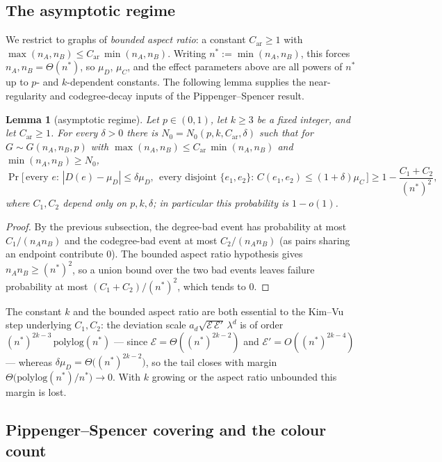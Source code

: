 \documentclass[11pt,a4paper]{article}
\newtheorem{lemma}[theorem]{Lemma}
\theoremstyle{definition}
\theoremstyle{remark}
\begin{document}
\subsection{The asymptotic regime}

We restrict to graphs of \emph{bounded aspect ratio}: a constant
$C_{\mathrm{ar}} \geq 1$ with
$\max(n_A, n_B) \leq C_{\mathrm{ar}}\,\min(n_A, n_B)$. Writing
$n^* := \min(n_A, n_B)$, this forces $n_A, n_B = \Theta(n^*)$, so
$\mu_D$, $\mu_C$, and the effect parameters above are all powers of
$n^*$ up to $p$- and $k$-dependent constants. The following lemma supplies the
near-regularity and codegree-decay inputs of the Pippenger--Spencer result.

\begin{lemma}[asymptotic regime]
\label{lem:asymp-regime}
Let $p \in (0, 1)$, let $k \geq 3$ be a fixed integer, and let
$C_{\mathrm{ar}} \geq 1$. For every $\delta > 0$ there is
$N_0 = N_0(p, k, C_{\mathrm{ar}}, \delta)$ such that for
$G \sim G(n_A, n_B, p)$ with
$\max(n_A, n_B) \leq C_{\mathrm{ar}}\,\min(n_A, n_B)$ and
$\min(n_A, n_B) \geq N_0$,
\[
\Pr\bigl[\,
\text{every } e\!:\, |D(e) - \mu_D| \leq \delta \mu_D,\ \
\text{every disjoint } \{e_1, e_2\}\!:\, C(e_1, e_2) \leq (1 + \delta)\mu_C
\,\bigr] \geq 1 - \frac{C_1 + C_2}{(n^*)^2},
\]
where $C_1, C_2$ depend only on $p, k, \delta$; in particular this
probability is $1 - o(1)$.
\end{lemma}

\begin{proof}
By the previous subsection, the degree-bad event has probability at
most $C_1 / (n_A n_B)$ and the codegree-bad event at most
$C_2 / (n_A n_B)$ (as pairs sharing an endpoint contribute $0$). The
bounded aspect ratio hypothesis gives $n_A n_B \geq (n^*)^2$, so a
union bound over the two bad events leaves failure probability at most
$(C_1 + C_2) / (n^*)^2$, which tends to $0$.
\end{proof}

The constant $k$ and the bounded aspect ratio are both essential to
the Kim--Vu step underlying $C_1, C_2$: the deviation scale
$a_d \sqrt{\mathcal{E}\,\mathcal{E}'}\,\lambda^d$ is of order
$(n^*)^{2k-3}\,\mathrm{polylog}(n^*)$ --- since
$\mathcal{E} = \Theta((n^*)^{2k-2})$ and
$\mathcal{E}' = O((n^*)^{2k-4})$ --- whereas
$\delta \mu_D = \Theta\bigl((n^*)^{2k-2}\bigr)$, so the tail closes
with margin $\Theta\bigl(\mathrm{polylog}(n^*) / n^*\bigr) \to 0$.
With $k$ growing or the aspect ratio unbounded this margin is lost.

\subsection{Pippenger--Spencer covering and the colour count}
\end{document}
